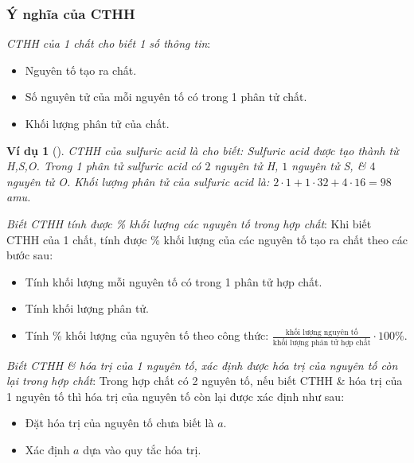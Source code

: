 \documentclass{article}
\newtheorem{vidu}{Ví dụ}
\begin{document}
\subsubsection{Ý nghĩa của CTHH}
 \textit{CTHH của 1 chất cho biết 1 số thông tin}:
\begin{itemize}
	\item Nguyên tố tạo ra chất.
	\item Số nguyên tử của mỗi nguyên tố có trong 1 phân tử chất.
	\item Khối lượng phân tử của chất.
\end{itemize}

\begin{vidu}[]
	CTHH của sulfuric acid là \emph{} cho biết: Sulfuric acid được tạo thành từ \emph{H,S,O}. Trong 1 phân tử sulfuric acid có $2$ nguyên tử \emph{H}, $1$ nguyên tử \emph{S}, \& $4$ nguyên tử \emph{O}. Khối lượng phân tử của sulfuric acid là: $2\cdot1 + 1\cdot32 + 4\cdot16 = 98$ amu.
\end{vidu}
\noindent{} \textit{Biết CTHH tính được \% khối lượng các nguyên tố trong hợp chất}: Khi biết CTHH của 1 chất, tính được \% khối lượng của các nguyên tố tạo ra chất theo các bước sau:
\begin{itemize}
	\item Tính khối lượng mỗi nguyên tố có trong 1 phân tử hợp chất.
	\item Tính khối lượng phân tử.
	\item Tính \% khối lượng của nguyên tố theo công thức: $\frac{\mbox{khối lượng nguyên tố}}{\mbox{khối lượng phân tử hợp chất}}\cdot100$\%.
\end{itemize}
\noindent{} \textit{Biết CTHH \& hóa trị của 1 nguyên tố, xác định được hóa trị của nguyên tố còn lại trong hợp chất}: Trong hợp chất có 2 nguyên tố, nếu biết CTHH \& hóa trị của 1 nguyên tố thì hóa trị của nguyên tố còn lại được xác định như sau:
\begin{itemize}
	\item Đặt hóa trị của nguyên tố chưa biết là $a$.
	\item Xác định $a$ dựa vào quy tắc hóa trị.
\end{itemize}
\end{document}
